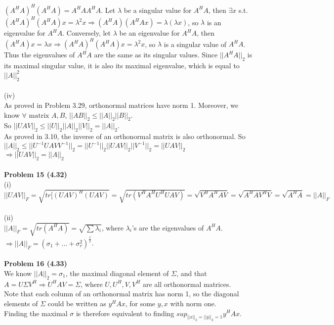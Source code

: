\documentclass[letterpaper,12pt]{article}
\theoremstyle{definition}
\begin{document}
$(A^HA)^H(A^HA) = A^HAA^HA$. Let $\lambda$ be a singular value for $A^HA$, then $\exists x$ s.t. $(A^HA)^H(A^HA) x = \lambda^2 x\Rightarrow (A^H A)(A^H A x) = \lambda(\lambda x)$, so $\lambda$ is an eigenvalue for $A^HA$. Conversely, let $\lambda$ be an eigenvalue for $A^HA$, then $(A^HA)x = \lambda x\Rightarrow (A^HA)^H(A^HA) x = \lambda^2 x$, so $\lambda$ is a singular value of $A^HA$. Thus the eigenvalues of $A^HA$ are the same as its singular values. Since $||A^HA||_2$ is its maximal singular value, it is also its maximal eigenvalue, which is equal to $||A||_2^2$\\
\\
(iv)\\
As proved in Problem 3.29, orthonormal matrices have norm 1. Moreover, we know $\forall \text{ matrix }A,B$, $||AB||_2\leq ||A||_2||B||_2$.\\
So $||UAV||_2 \leq ||U||_2||A||_2||V||_2 = ||A||_2$.\\
As proved in 3.10, the inverse of an orthonormal matrix is also orthonormal. So $||A||_2 \leq ||U^{-1}UAVV^{-1}||_2 = ||U^{-1}||_2 ||UAV||_2 ||V^{-1}||_2 = ||UAV||_2$\\
$\Rightarrow ||UAV||_2 = ||A||_2$\\
\\
\noindent\textbf{Problem 15 (4.32)} \\
(i)\\
$||UAV||_F = \sqrt{tr[(UAV)^H(UAV)} = \sqrt{tr(V^HA^HU^HUAV)} = \sqrt{V^HA^HAV} = \sqrt{A^HAV^HV} = \sqrt{A^HA} =||A||_F$\\
\\
(ii)\\
$||A||_F = \sqrt{tr(A^HA)} = \sqrt{\sum{\lambda_i}}$, where $\lambda_i$'s are the eigenvalues of $A^HA$. \\
$\Rightarrow ||A||_F = (\sigma_1+...+\sigma_r^2)^{\frac{1}{2}}$.\\
\\
\noindent\textbf{Problem 16 (4.33)} \\
We know $||A||_2 = \sigma_1$, the maximal diagonal element of $\Sigma$, and that $A = U\Sigma V^H\Rightarrow U^HAV = \Sigma$, where $U, U^H, V, V^H$ are all orthonormal matrices.\\
Note that each column of an orthonormal matrix has norm 1, so the diagonal elements of $\Sigma$ could be written as $y^HAx$, for some $y, x$ with norm one.\\
Finding the maximal $\sigma$ is therefore equivalent to finding $sup_{||x||_2=||y||_2=1}y^HAx$.\\
\end{document}
